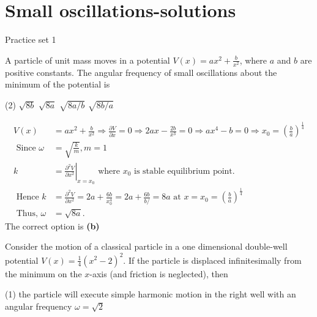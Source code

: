 \chapter{Small oscillations-solutions}
\begin{abox}
	Practice set 1
\end{abox}
\begin{enumerate}
	\begin{minipage}{\textwidth}
		\item  A particle of unit mass moves in a potential $V(x)=a x^{2}+\frac{b}{x^{2}}$, where $a$ and $b$ are positive constants. The angular frequency of small oscillations about the minimum of the potential is
	\end{minipage}
	\begin{tasks}(2)
		\task[\textbf{A.}] $\sqrt{8 b}$
		\task[\textbf{B.}]$\sqrt{8 a}$
		\task[\textbf{C.}] $\sqrt{8 a / b}$
		\task[\textbf{D.}]$\sqrt{8 b / a}$
	\end{tasks}
	\begin{answer}
		\begin{align*}
		V(x)&=a x^{2}+\frac{b}{x^{2}} \Rightarrow \frac{\partial V}{\partial x}=0 \Rightarrow 2 a x-\frac{2 b}{x^{3}}=0 \Rightarrow a x^{4}-b=0 \Rightarrow x_{0}=\left(\frac{b}{a}\right)^{\frac{1}{4}}\\
		\text { Since } \omega&=\sqrt{\frac{k}{m}}, m=1\\
		k&=\left.\frac{\partial^{2} V}{\partial x^{2}}\right|_{x=x_{0}} \text { where } x_{0} \text { is stable equilibrium point. }\\
		\text { Hence } k&=\frac{\partial^{2} V}{\partial x^{2}}=2 a+\frac{6 b}{x_{0}^{4}}=2 a+\frac{6 b}{b /}=8 a \text { at } x=x_{0}=\left(\frac{b}{a}\right)^{\frac{1}{4}}\\
		\text { Thus, } \omega&=\sqrt{8 a} \text {. }
		\end{align*}
		The correct option is \textbf{(b)}
	\end{answer}
	\begin{minipage}{\textwidth}
		\item Consider the motion of a classical particle in a one dimensional double-well potential $V(x)=\frac{1}{4}\left(x^{2}-2\right)^{2} .$ If the particle is displaced infinitesimally from the minimum on the $x$-axis (and friction is neglected), then
	\end{minipage}
	\begin{tasks}(1)
		\task[\textbf{A.}] the particle will execute simple harmonic motion in the right well with an angular frequency $\omega=\sqrt{2}$

\end{tasks}
\end{enumerate}
